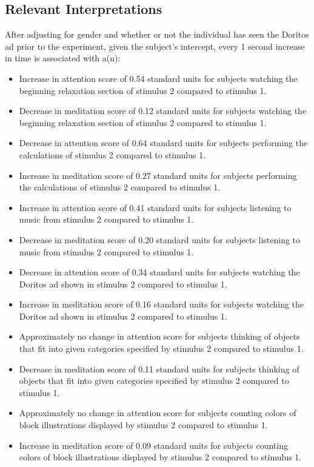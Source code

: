 \documentclass{article}[12pt]
\begin{document}


\subsection{Relevant Interpretations}

\noindent After adjusting for gender and whether or not the individual has seen the Doritos ad prior to the experiment, given the subject's intercept, every 1 second increase in time is associated with a(n): 
\begin{itemize}
\item Increase in attention score of 0.54 standard units for subjects watching the beginning relaxation section of stimulus 2 compared to stimulus 1.

\item Decrease in meditation score of 0.12 standard units for subjects watching the beginning relaxation section of stimulus 2 compared to stimulus 1.
\item Decrease in attention score of 0.64 standard units for subjects performing the calculations of stimulus 2 compared to stimulus 1.
\item Increase in meditation score of 0.27 standard units for subjects performing the calculations of stimulus 2 compared to stimulus 1.
\item Increase in attention score of 0.41 standard units for subjects listening to music from stimulus 2 compared to stimulus 1.
\item Decrease in meditation score of 0.20 standard units for subjects listening to music from stimulus 2 compared to stimulus 1.
\item Decrease in attention score of 0.34 standard units for subjects watching the Doritos ad shown in stimulus 2 compared to stimulus 1.
\item Increase in meditation score of 0.16 standard units for subjects watching the Doritos ad shown in stimulus 2 compared to stimulus 1.
\item Approximately no change in attention score for subjects thinking of objects that fit into given categories specified by stimulus 2 compared to stimulus 1.
\item Decrease in meditation score of 0.11 standard units for subjects thinking of objects that fit into given categories specified by stimulus 2 compared to stimulus 1.
\item Approximately no change in attention score for subjects counting colors of block illustrations displayed by stimulus 2 compared to stimulus 1.
\item Increase in meditation score of 0.09 standard units for subjects counting colors of block illustrations displayed by stimulus 2 compared to stimulus 1.
\end{itemize}
\end{document}
